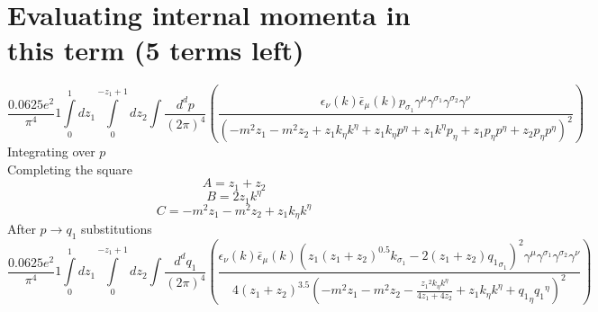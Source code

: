 \section*{Evaluating internal momenta in this term (5 terms left)}
\begin{dmath}\frac{0.0625 e^{2}}{\pi^{4}}1\int\limits_{ 0 }^{ 1 } d{ z_{ 1 } }\int\limits_{ 0 }^{ - { z_{ 1 } } + 1 } d{ z_{ 2 } }\int\frac{d^d p }{ (2\pi)^4 }\left(\frac{\epsilon_{ \nu }({ k }) \bar{\epsilon}_{ \mu }({ k }) { { p }_{ \sigma_1 } } { \gamma^{ \mu } } { \gamma^{ \sigma_1 } } { \gamma^{ \sigma_2 } } { \gamma^{ \nu } }}{\left(- m^{2} { z_{ 1 } } - m^{2} { z_{ 2 } } + { z_{ 1 } } { { k }_{ \eta } } { { k }^{ \eta } } + { z_{ 1 } } { { k }_{ \eta } } { { p }^{ \eta } } + { z_{ 1 } } { { k }^{ \eta } } { { p }_{ \eta } } + { z_{ 1 } } { { p }_{ \eta } } { { p }^{ \eta } } + { z_{ 2 } } { { p }_{ \eta } } { { p }^{ \eta } }\right)^{2}}\right)\end{dmath}
Integrating over $p$\\
Completing the square\
\begin{dmath}A = { z_{ 1 } } + { z_{ 2 } }\end{dmath}
\begin{dmath}B = 2 { z_{ 1 } } { { k }^{ \eta } }\end{dmath}
\begin{dmath}C = - m^{2} { z_{ 1 } } - m^{2} { z_{ 2 } } + { z_{ 1 } } { { k }_{ \eta } } { { k }^{ \eta } }\end{dmath}
After $p \to q_1$ substitutions
\begin{dmath}\frac{0.0625 e^{2}}{\pi^{4}}1\int\limits_{ 0 }^{ 1 } d{ z_{ 1 } }\int\limits_{ 0 }^{ - { z_{ 1 } } + 1 } d{ z_{ 2 } }\int\frac{d^d q_1 }{ (2\pi)^4 }\left(\frac{\epsilon_{ \nu }({ k }) \bar{\epsilon}_{ \mu }({ k }) \left({ z_{ 1 } } \left({ z_{ 1 } } + { z_{ 2 } }\right)^{0.5} { { k }_{ \sigma_1 } } - 2 \left({ z_{ 1 } } + { z_{ 2 } }\right) { { q_1 }_{ \sigma_1 } }\right)^{2} { \gamma^{ \mu } } { \gamma^{ \sigma_1 } } { \gamma^{ \sigma_2 } } { \gamma^{ \nu } }}{4 \left({ z_{ 1 } } + { z_{ 2 } }\right)^{3.5} \left(- m^{2} { z_{ 1 } } - m^{2} { z_{ 2 } } - \frac{{ z_{ 1 } }^{2} { { k }_{ \eta } } { { k }^{ \eta } }}{4 { z_{ 1 } } + 4 { z_{ 2 } }} + { z_{ 1 } } { { k }_{ \eta } } { { k }^{ \eta } } + { { q_1 }_{ \eta } } { { q_1 }^{ \eta } }\right)^{2}}\right)\end{dmath}
